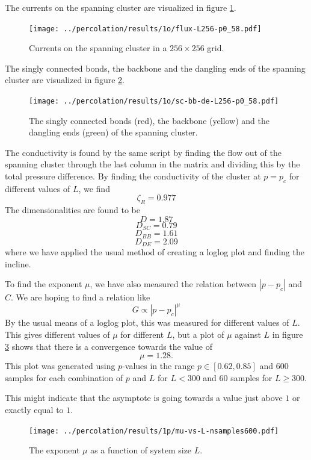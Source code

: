 \documentclass[a4paper,reprint,floatfix,amsmath,amssymb,aps,pra]{revtex4-1}
\begin{document}
The currents on the spanning cluster are visualized in figure \ref{fig:flow}.
%
\begin{figure}
  \centering
  \texttt{[image: ../percolation/results/1o/flux-L256-p0\_58.pdf]}
  \caption{Currents on the spanning cluster in a $256 \times 256$ grid.}
  \label{fig:flow}
\end{figure}
%
The singly connected bonds, the backbone and the dangling ends of the spanning cluster are visualized in figure \ref{fig:sc-bb-de}.
%
\begin{figure}
  \centering
  \texttt{[image: ../percolation/results/1o/sc-bb-de-L256-p0\_58.pdf]}
  \caption{The singly connected bonds (red), the backbone (yellow) and the dangling ends (green) of the spanning cluster.}
  \label{fig:sc-bb-de}
\end{figure}
%
The conductivity is found by the same script by finding the flow out of the spanning cluster through the last column in the matrix and dividing this by the total pressure difference. By finding the conductivity of the cluster at $p=p_{c}$ for different values of $L$, we find
\begin{equation}
  \zeta_R = 0.977
\end{equation}
The dimensionalities are found to be
\begin{equation}
  D = 1.87
\end{equation}
\begin{equation}
  D_{SC} = 0.79
\end{equation} 
\begin{equation}
  D_{BB} = 1.61
\end{equation} 
\begin{equation}
  D_{DE} = 2.09
\end{equation}
where we have applied the usual method of creating a loglog plot and finding the incline.

To find the exponent $\mu$, we have also measured the relation between $|p-p_{c}|$ and $C$. We are hoping to find a relation like
\begin{equation}
  G \propto |p-p_{c}|^{\mu}
\end{equation} 
By the usual means of a loglog plot, this was measured for different values of $L$. This gives different values of $\mu$ for different $L$, but a plot of $\mu$ against $L$ in figure \ref{fig:mu-vs-L} shows that there is a convergence towards the value of
\begin{equation}
  \mu = 1.28.
\end{equation}
This plot was generated using $p$-values in the range $p \in [0.62, 0.85]$ and $600$ samples for each combination of $p$ and $L$ for $L<300$ and $60$ samples for $L \geq 300$.

This might indicate that the asymptote is going towards a value just above $1$ or exactly equal to $1$.
\begin{figure}
  \centering
  \texttt{[image: ../percolation/results/1p/mu-vs-L-nsamples600.pdf]}
  \caption{The exponent $\mu$ as a function of system size $L$.}
  \label{fig:mu-vs-L}
\end{figure}
\end{document}

